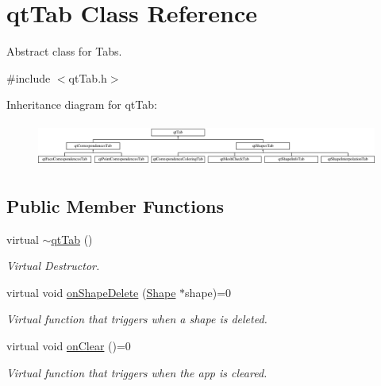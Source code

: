 \hypertarget{classqt_tab}{}\section{qt\+Tab Class Reference}
\label{classqt_tab}


Abstract class for Tabs.  




{\ttfamily \#include $<$qt\+Tab.\+h$>$}

Inheritance diagram for qt\+Tab\+:\begin{figure}[H]
\begin{center}
\leavevmode
\includegraphics[height=1.450777cm]{classqt_tab}
\end{center}
\end{figure}
\subsection*{Public Member Functions}
\begin{DoxyCompactItemize}
\item 
\hypertarget{classqt_tab_a269279758bb0b73d3a04477ac3799965}{}virtual \hyperlink{classqt_tab_a269279758bb0b73d3a04477ac3799965}{$\sim$qt\+Tab} ()\label{classqt_tab_a269279758bb0b73d3a04477ac3799965}

\begin{DoxyCompactList}\small\item\em Virtual Destructor. \end{DoxyCompactList}\item 
virtual void \hyperlink{classqt_tab_a8811879f2aaf15777025427eec7b9fd9}{on\+Shape\+Delete} (\hyperlink{class_shape}{Shape} $\ast$shape)=0
\begin{DoxyCompactList}\small\item\em Virtual function that triggers when a shape is deleted. \end{DoxyCompactList}\item 
virtual void \hyperlink{classqt_tab_aeca48d82349df4c61fbfb66c4273c9b6}{on\+Clear} ()=0
\begin{DoxyCompactList}\small\item\em Virtual function that triggers when the app is cleared. \end{DoxyCompactList}\end{DoxyCompactItemize}


